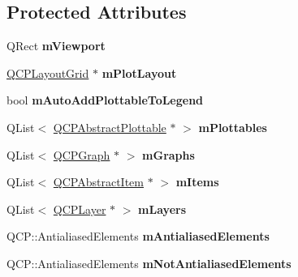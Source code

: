 \subsection*{Protected Attributes}
\begin{DoxyCompactItemize}
\item 
\hypertarget{class_q_custom_plot_ac0a7c38a715526c257cff95774f83ab6}{}\label{class_q_custom_plot_ac0a7c38a715526c257cff95774f83ab6} 
Q\+Rect {\bfseries m\+Viewport}
\item 
\hypertarget{class_q_custom_plot_ac97298756882a0eecd98151679850ac1}{}\label{class_q_custom_plot_ac97298756882a0eecd98151679850ac1} 
\hyperlink{class_q_c_p_layout_grid}{Q\+C\+P\+Layout\+Grid} $\ast$ {\bfseries m\+Plot\+Layout}
\item 
\hypertarget{class_q_custom_plot_aaf3ea6a4cb04d35a149cc9a0cdac3394}{}\label{class_q_custom_plot_aaf3ea6a4cb04d35a149cc9a0cdac3394} 
bool {\bfseries m\+Auto\+Add\+Plottable\+To\+Legend}
\item 
\hypertarget{class_q_custom_plot_a62bf8e4e7f8d23fc1e9301ba0148269f}{}\label{class_q_custom_plot_a62bf8e4e7f8d23fc1e9301ba0148269f} 
Q\+List$<$ \hyperlink{class_q_c_p_abstract_plottable}{Q\+C\+P\+Abstract\+Plottable} $\ast$ $>$ {\bfseries m\+Plottables}
\item 
\hypertarget{class_q_custom_plot_adaf8d407d72a725169d7dbed2ee386bb}{}\label{class_q_custom_plot_adaf8d407d72a725169d7dbed2ee386bb} 
Q\+List$<$ \hyperlink{class_q_c_p_graph}{Q\+C\+P\+Graph} $\ast$ $>$ {\bfseries m\+Graphs}
\item 
\hypertarget{class_q_custom_plot_a6a93905372326e31e98d6c3bc8953ec8}{}\label{class_q_custom_plot_a6a93905372326e31e98d6c3bc8953ec8} 
Q\+List$<$ \hyperlink{class_q_c_p_abstract_item}{Q\+C\+P\+Abstract\+Item} $\ast$ $>$ {\bfseries m\+Items}
\item 
\hypertarget{class_q_custom_plot_a72ee313041b873d76c198793ce7e6c37}{}\label{class_q_custom_plot_a72ee313041b873d76c198793ce7e6c37} 
Q\+List$<$ \hyperlink{class_q_c_p_layer}{Q\+C\+P\+Layer} $\ast$ $>$ {\bfseries m\+Layers}
\item 
\hypertarget{class_q_custom_plot_aa333200629256830e273873b582a5524}{}\label{class_q_custom_plot_aa333200629256830e273873b582a5524} 
Q\+C\+P\+::\+Antialiased\+Elements {\bfseries m\+Antialiased\+Elements}
\item 
\hypertarget{class_q_custom_plot_a2b6ebcad00a90ba07f146cefcd4293da}{}\label{class_q_custom_plot_a2b6ebcad00a90ba07f146cefcd4293da} 
Q\+C\+P\+::\+Antialiased\+Elements {\bfseries m\+Not\+Antialiased\+Elements}

\end{DoxyCompactItemize}
